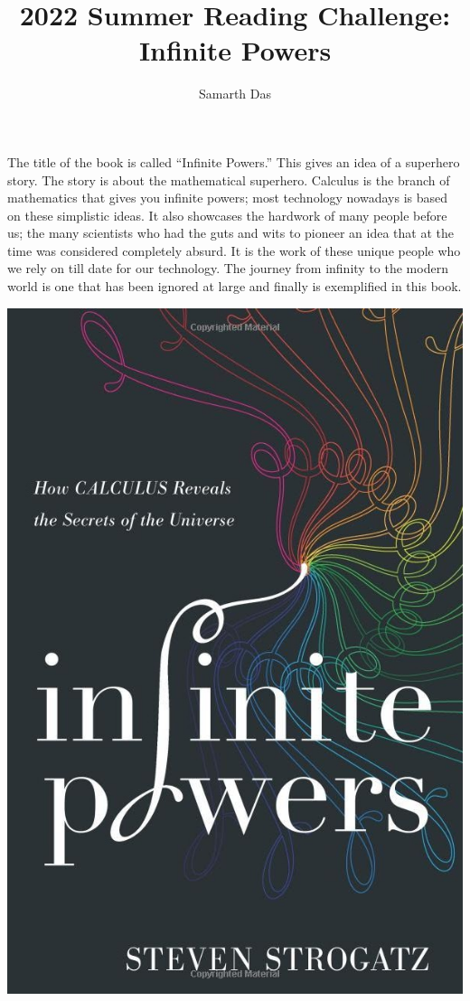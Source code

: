 \documentclass{article}
\title{2022 Summer Reading Challenge: Infinite Powers}
\author{Samarth Das}
\begin{document}
\maketitle
The title of the book is called “Infinite Powers.” This gives an idea of a superhero story. The
story is about the mathematical superhero. Calculus is the branch of mathematics that gives you
infinite powers; most technology nowadays is based on these simplistic ideas. It also showcases
the hardwork of many people before us; the many scientists who had the guts and wits to
pioneer an idea that at the time was considered completely absurd. It is the work of these
unique people who we rely on till date for our technology. The journey from infinity to the modern
world is one that has been ignored at large and finally is exemplified in this book.

\begin{center}
   \includegraphics[scale=0.25]{images/infinity_powers.jpg}
\end{center}
\end{document}
